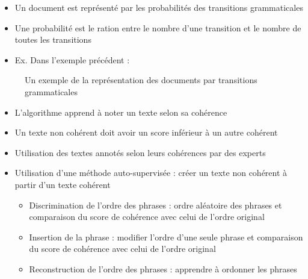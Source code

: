 \documentclass{KodeBook}
\begin{document}
\begin{itemize}
	\item Un document est représenté par les probabilités des transitions grammaticales
	\item Une probabilité est le ration entre le nombre d'une transition et le nombre de toutes les transitions
	\item Ex. Dans l'exemple précédent : 
\end{itemize}
\begin{figure}
	\centering
	\caption{Un exemple de la représentation des documents par transitions grammaticales \cite{2008-barzilay-lapata}}
\end{figure}

\begin{itemize}
	\item L'algorithme apprend à noter un texte selon sa cohérence
	\item Un texte non cohérent doit avoir un score inférieur à un autre cohérent
	\item Utilisation des textes annotés selon leurs cohérences par des experts
	\item Utilisation d'une méthode auto-supervisée : créer un texte non cohérent à partir d'un texte cohérent
	\begin{itemize}
		\item Discrimination de l'ordre des phrases : ordre aléatoire des phrases et comparaison du score de cohérence avec celui de l'ordre original
		\item Insertion de la phrase : modifier l'ordre d'une seule phrase et comparaison du score de cohérence avec celui de l'ordre original
		\item Reconstruction de l'ordre des phrases : apprendre à ordonner les phrases
	\end{itemize}
\end{itemize}



\begin{discussion}



\end{discussion}

\ifx\wholebook\relax\else
% 
% 
	
\end{document}
